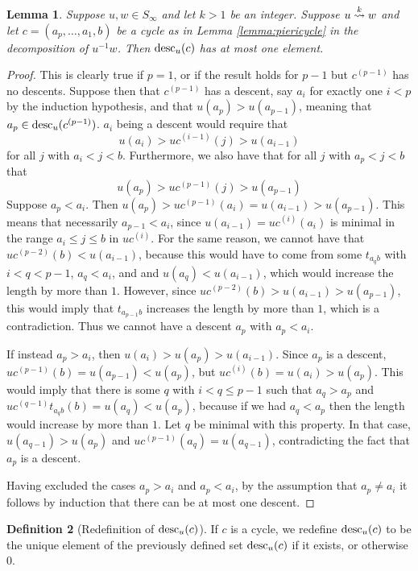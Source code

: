 \documentclass{amsart}
\newtheorem{lemma}{Lemma}[section]
\theoremstyle{definition}
\newtheorem{definition}[lemma]{Definition}
\theoremstyle{remark}
\numberwithin{equation}{section}
\newcommand{\xrightsquigarrow}[2][]{%
	\mathrel{\mathop{\rightsquigarrow}\limits^{\scriptstyle #2}%
	\ifx\hfuzz#1\hfuzz\else_{\scriptstyle #1}\fi}%
}
\newcommand{\tom}[1]{\ensuremath{\xrightsquigarrow{#1}}}
\begin{document}
\begin{lemma} \label{lemma:onedescent}
Suppose $u,w\in S_\infty$ and let $k>1$ be an integer. Suppose $u\tom{k}w$ and let $c=(a_p,\ldots,a_1,b)$ be a cycle as in Lemma \ref{lemma:piericycle} in the decomposition of $u^{-1}w$. Then $\mathrm{desc}_u(c)$ has at most one element.
\end{lemma}
\begin{proof}
This is clearly true if $p=1$, or if the result holds for $p-1$ but $c^{(p-1)}$ has no descents. Suppose then that $c^{(p-1)}$ has a descent, say $a_i$ for exactly one $i<p$ by the induction hypothesis, and that $u(a_p)>u(a_{p-1})$, meaning that $a_p\in\mathrm{desc}_u(c^{(p-1)})$. $a_i$ being a descent would require that 
$$u(a_i)>uc^{(i-1)}(j)>u(a_{i-1})$$
for all $j$ with $a_i<j<b$. Furthermore, we also have that for all $j$ with $a_p<j<b$ that
$$u(a_p)>uc^{(p-1)}(j)>u(a_{p-1})$$
Suppose $a_p<a_i$. Then $u(a_p)>uc^{(p-1)}(a_i)=u(a_{i-1})>u(a_{p-1})$. This means that necessarily $a_{p-1}<a_i$, since $u(a_{i-1})=uc^{(i)}(a_i)$ is minimal in the range $a_i\leq j\leq b$ in $uc^{(i)}$. For the same reason, we cannot have that $uc^{(p-2)}(b)<u(a_{i-1})$, because this would have to come from some $t_{a_qb}$ with $i<q<p-1$, $a_q<a_i$, and and $u(a_q)<u(a_{i-1})$, which would increase the length by more than $1$. However, since $uc^{(p-2)}(b)>u(a_{i-1})>u(a_{p-1})$, this would imply that $t_{a_{p-1}b}$ increases the length by more than $1$, which is a contradiction. Thus we cannot have a descent $a_p$ with $a_p<a_i$. 

If instead $a_p>a_i$, then $u(a_i)>u(a_p)>u(a_{i-1})$. Since $a_p$ is a descent, $uc^{(p-1)}(b)=u(a_{p-1})<u(a_p)$, but $uc^{(i)}(b)=u(a_i)>u(a_p)$. This would imply that there is some $q$ with $i<q\leq p-1$ such that $a_q>a_p$ and $uc^{(q-1)}t_{a_qb}(b)=u(a_q)<u(a_p)$, because if we had $a_q<a_p$ then the length would increase by more than $1$. Let $q$ be minimal with this property. In that case, $u(a_{q-1})>u(a_p)$ and $uc^{(p-1)}(a_q)=u(a_{q-1})$, contradicting the fact that $a_p$ is a descent. 

Having excluded the cases $a_p>a_i$ and $a_p<a_i$, by the assumption that $a_p\neq a_i$ it follows by induction that there can be at most one descent.
\end{proof}

\begin{definition}[Redefinition of $\mathrm{desc}_u(c)$]
If $c$ is a cycle, we redefine $\mathrm{desc}_u(c)$ to be the unique element of the previously defined set $\mathrm{desc}_u(c)$ if it exists, or otherwise $0$.
\end{definition}
\end{document}
